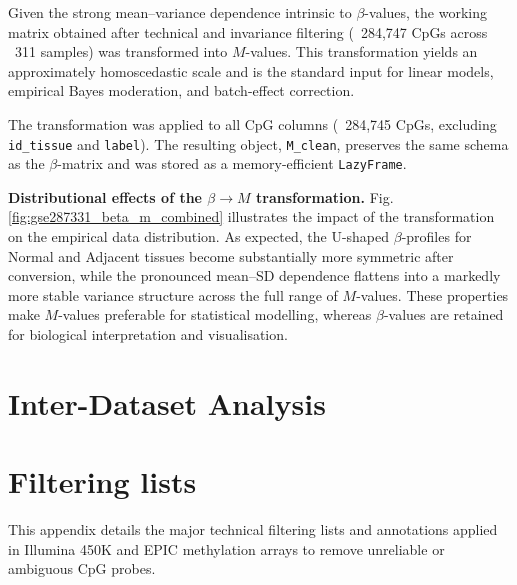 \documentclass[10pt]{extarticle}
\newcommand{\good}[1]{\textcolor{teal!70!black}{\ding{51}~#1}}
\begin{document}
Given the strong mean--variance dependence intrinsic to $\beta$-values, the working
matrix obtained after technical and invariance filtering  
(\good{284{,}747 CpGs} across \good{311 samples}) 
was transformed into $M$-values.
This transformation yields an approximately homoscedastic scale and is the standard
input for linear models, empirical Bayes moderation, and batch-effect correction.

The transformation was applied to all CpG columns (\good{284{,}745 CpGs}, excluding
\texttt{id\_tissue} and \texttt{label}).  
The resulting object, \texttt{M\_clean}, preserves the same schema as the
$\beta$-matrix and was stored as a memory-efficient \texttt{LazyFrame}.

\textbf{Distributional effects of the $\beta \rightarrow M$ transformation.}
Fig. \ref{fig:gse287331_beta_m_combined} illustrates the
impact of the transformation on the empirical data distribution.  
As expected, the U-shaped $\beta$-profiles for Normal and Adjacent tissues become
substantially more symmetric after conversion, while the pronounced mean--SD
dependence flattens into a markedly more stable variance structure across the full
range of $M$-values.  
These properties make $M$-values preferable for statistical modelling, whereas
$\beta$-values are retained for biological interpretation and visualisation.


\section{Inter-Dataset Analysis}
\label{sec:inter_dataset}



















\clearpage

\appendix
\section{Filtering lists}
\label{app:probe-filters}

This appendix details the major technical filtering lists and annotations applied in Illumina 450K and EPIC methylation arrays to remove unreliable or ambiguous CpG probes. 
\end{document}
